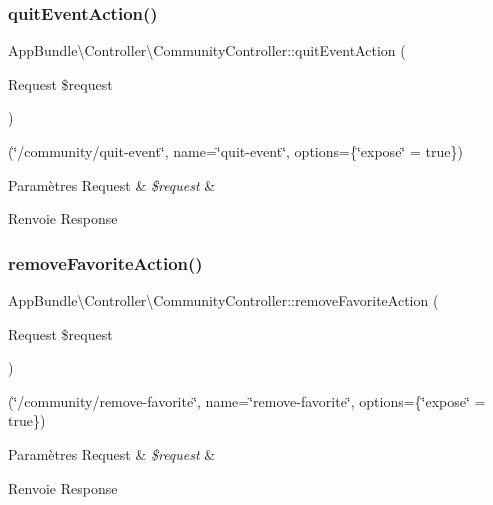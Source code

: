 \subsubsection{\texorpdfstring{quit\+Event\+Action()}{quitEventAction()}}
{\footnotesize\ttfamily App\+Bundle\textbackslash{}\+Controller\textbackslash{}\+Community\+Controller\+::quit\+Event\+Action (\begin{DoxyParamCaption}\item[{Request}]{\$request }\end{DoxyParamCaption})}

(\char`\"{}/community/quit-\/event\char`\"{}, name=\char`\"{}quit-\/event\char`\"{}, options=\{\char`\"{}expose\char`\"{} = true\}) 
\begin{DoxyParams}[1]{Paramètres}
Request & {\em \$request} & \\
\hline
\end{DoxyParams}
\begin{DoxyReturn}{Renvoie}
Response 
\end{DoxyReturn}
\mbox{\label{classAppBundle_1_1Controller_1_1CommunityController_aabe67faadd72f242589b5459ce11d7ad}} 
\subsubsection{\texorpdfstring{remove\+Favorite\+Action()}{removeFavoriteAction()}}
{\footnotesize\ttfamily App\+Bundle\textbackslash{}\+Controller\textbackslash{}\+Community\+Controller\+::remove\+Favorite\+Action (\begin{DoxyParamCaption}\item[{Request}]{\$request }\end{DoxyParamCaption})}

(\char`\"{}/community/remove-\/favorite\char`\"{}, name=\char`\"{}remove-\/favorite\char`\"{}, options=\{\char`\"{}expose\char`\"{} = true\}) 
\begin{DoxyParams}[1]{Paramètres}
Request & {\em \$request} & \\
\hline
\end{DoxyParams}
\begin{DoxyReturn}{Renvoie}
Response 
\end{DoxyReturn}
\mbox{\label{classAppBundle_1_1Controller_1_1CommunityController_afe7246d7f115e157d6ab07a662fcbced}} 
